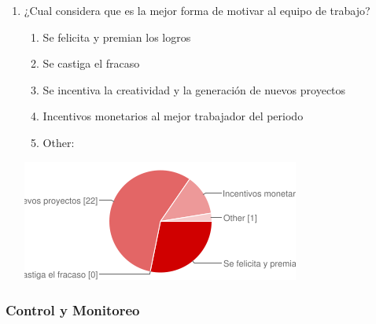 \begin{enumerate}
\begin{center}
        \end{center}
	\item ¿Cual considera que es la mejor forma de
		motivar al equipo de trabajo?
		\begin{enumerate}
			\item Se felicita y premian los logros
			\item Se castiga el fracaso
			\item Se incentiva la creatividad y la generación de nuevos proyectos
			\item Incentivos monetarios al mejor trabajador del periodo
			\item Other: 
		\end{enumerate}
        \begin{center}
        \includegraphics[scale=0.7]{images/encuesta2/15}
        \end{center}
\end{enumerate}

\subsubsection{Control y Monitoreo}

